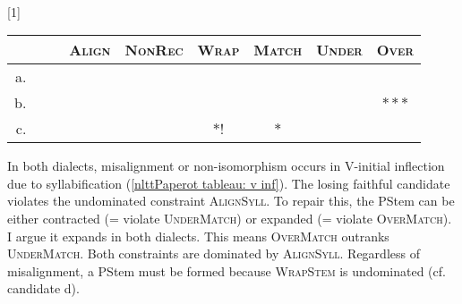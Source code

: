 \begin{exe}
	\ex ~\\
	
	\vspace{-1cm}\label{nlttPaperot tableau: c initiai inf} \renewcommand*\arraystretch{1.2}
	\scalebox{1}[1]{\begin{tabular}[t]{|rrl||c:c:c|c:c:c|} \hline
			 & \textsc{Align} & \textsc{NonRec} & \textsc{Wrap} & \textsc{Match} & \textsc{Under} & \textsc{Over} \\[0.5ex]
			\hline \hline a. &  &  & & & & & & \\
			\hline b. & &  & & & & & & $\ast\ast\ast$ \\
			\hline c. & &  & & & $\ast$! & $\ast$ &  &  \\
			\hline \end{tabular}} \renewcommand*\arraystretch{1} 
	
\end{exe}


In both dialects, misalignment or non-isomorphism occurs in V-initial inflection due to syllabification (\ref{nlttPaperot tableau: v inf}). The losing faithful candidate \textit{} violates the undominated constraint \textsc{AlignSyll}. To repair this, the PStem can be either contracted \textit{} (= violate \textsc{UnderMatch}) or expanded \textit{} (= violate \textsc{OverMatch}). I argue it expands in both dialects. This means {\textsc{OverMatch}} outranks \textsc{UnderMatch}. Both constraints are dominated by \textsc{AlignSyll}. Regardless of misalignment, a PStem must be formed because \textsc{WrapStem} is undominated (cf. candidate d).

